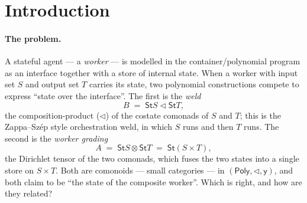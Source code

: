 \documentclass[11pt]{article}
\newcommand{\comp}{\mathbin{\triangleleft}}       %
\newcommand{\Poly}{\mathsf{Poly}}
\newcommand{\St}{\mathsf{St}}                      %
\newcommand{\y}{\mathsf{y}}
\theoremstyle{plain}
\theoremstyle{definition}
\theoremstyle{remark}
\begin{document}
\section{Introduction}

\paragraph{The problem.}
A stateful agent --- a \emph{worker} --- is modelled in the container/polynomial program
as an interface together with a store of internal state. When a worker with input set
$S$ and output set $T$ carries its state, two polynomial constructions compete to express
``state over the interface''. The first is the \emph{weld}
\[
  B \;=\; \St S \comp \St T,
\]
the composition-product ($\comp$) of the costate comonads of $S$ and $T$; this is the
Zappa--Sz\'ep style orchestration weld, in which $S$ runs and then $T$ runs. The second is
the \emph{worker grading}
\[
  A \;=\; \St S \otimes \St T \;=\; \St(S\times T),
\]
the Dirichlet tensor of the two comonads, which fuses the two states into a single store
on $S\times T$. Both are comonoids --- small categories --- in $(\Poly,\comp,\y)$, and both
claim to be ``the state of the composite worker''. Which is right, and how are they
related?
\end{document}
